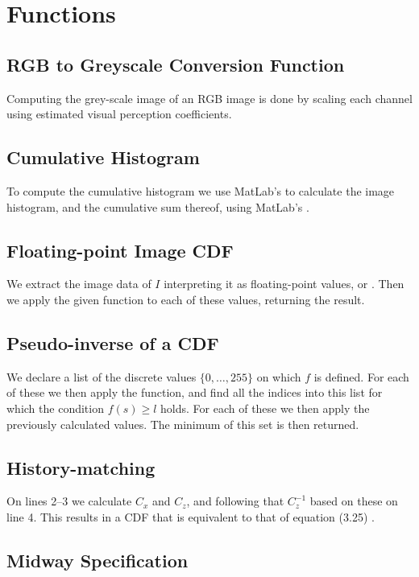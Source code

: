 
\section{Functions}

\subsection{RGB to Greyscale Conversion Function}
\label{appendix:rgb2grey}
Computing the grey-scale image of an RGB image is done by scaling each channel
using estimated visual perception coefficients\cite[pp. 11]{SB}.

\subsection{Cumulative Histogram}
\label{appendix:histcum}
To compute the cumulative histogram we use MatLab's  to calculate
the image histogram, and the cumulative sum thereof, using MatLab's
.

\subsection{Floating-point Image CDF}
\label{appendix:fpimg}
We extract the image data of $I$ interpreting it as floating-point values, or
. Then we apply the given  function to each of these
values, returning the result.

\subsection{Pseudo-inverse of a CDF}
\label{appendix:pseudo-inverse}
We declare a list of the discrete values $\{0,\dots,255\}$ on which $f$ is
defined. For each of these we then apply the  function, and find all
the indices into this list for which the condition $f(s) \geq l$ holds. For
each of these we then apply the previously calculated values. The minimum of
this set is then returned.

\subsection{History-matching}
\label{appendix:histmatch}
On lines 2--3 we calculate $C_x$ and $C_z$, and following that $C_z^{-1}$
based on these on line 4. This results in a CDF that is equivalent to that of
equation (3.25) \cite[pp. 74]{SB}.

\subsection{Midway Specification}
\label{appendix:midway}

